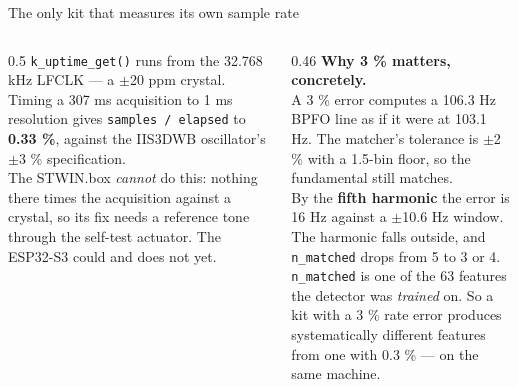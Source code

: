 \documentclass[aspectratio=169,10pt]{beamer}
\begin{document}
\begin{frame}{The only kit that measures its own sample rate}
  \begin{columns}[T]
    \begin{column}{0.5\textwidth}
      \small
      \texttt{k\_uptime\_get()} runs from the 32.768 kHz LFCLK --- a
      $\pm$20 ppm crystal. Timing a 307 ms acquisition to 1 ms resolution gives
      \texttt{samples / elapsed} to \textbf{0.33 \%}, against the IIS3DWB
      oscillator's $\pm$3 \% specification.
      \\[2mm]
      \scriptsize
      The STWIN.box \emph{cannot} do this: nothing there times the acquisition
      against a crystal, so its fix needs a reference tone through the self-test
      actuator. The ESP32-S3 could and does not yet.
    \end{column}
    \begin{column}{0.46\textwidth}
      \scriptsize
      \textbf{Why 3 \% matters, concretely.}
      \\[1mm]
      A 3 \% error computes a 106.3 Hz BPFO line as if it were at 103.1 Hz. The
      matcher's tolerance is $\pm$2 \% with a 1.5-bin floor, so the fundamental
      still matches.
      \\[1mm]
      By the \textbf{fifth harmonic} the error is 16 Hz against a $\pm$10.6 Hz
      window. The harmonic falls outside, and \texttt{n\_matched} drops from 5 to
      3 or 4.
      \\[1mm]
      \texttt{n\_matched} is one of the 63 features the detector was
      \emph{trained} on. So a kit with a 3 \% rate error produces systematically
      different features from one with 0.3 \% --- on the same machine.
    \end{column}
  \end{columns}
\end{frame}
\end{document}
